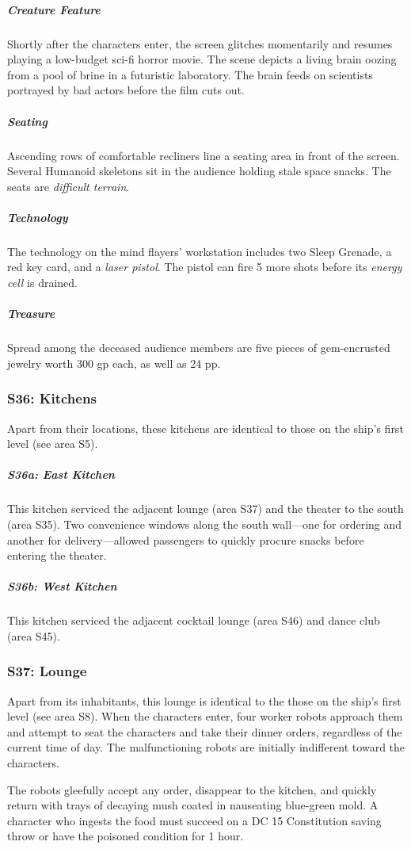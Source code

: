 \documentclass[10pt,a4paper,twoside,bg=print,twocolumn,openany,nodeprecatedcode]{dndbook}
\begin{document}
\subparagraph{Creature Feature}
Shortly after the characters enter, the screen glitches momentarily and resumes playing a low-budget sci-fi horror movie. The scene depicts a living brain oozing from a pool of brine in a futuristic laboratory. The brain feeds on scientists portrayed by bad actors before the film cuts out.

\subparagraph{Seating}
Ascending rows of comfortable recliners line a seating area in front of the screen. Several Humanoid skeletons sit in the audience holding stale space snacks. The seats are \textit{difficult terrain}.

\subparagraph{Technology}
The technology on the mind flayers' workstation includes two Sleep Grenade, a red key card, and a \textit{laser pistol}. The pistol can fire 5 more shots before its \textit{energy cell} is drained.

\subparagraph{Treasure}
Spread among the deceased audience members are five pieces of gem-encrusted jewelry worth 300 gp each, as well as 24 pp.

\subsubsection{S36: Kitchens}
Apart from their locations, these kitchens are identical to those on the ship's first level (see area S5).

\subparagraph{S36a: East Kitchen}
This kitchen serviced the adjacent lounge (area S37) and the theater to the south (area S35). Two convenience windows along the south wall—one for ordering and another for delivery—allowed passengers to quickly procure snacks before entering the theater.

\subparagraph{S36b: West Kitchen}
This kitchen serviced the adjacent cocktail lounge (area S46) and dance club (area S45).

\subsubsection{S37: Lounge}
Apart from its inhabitants, this lounge is identical to the those on the ship's first level (see area S8). When the characters enter, four worker robots approach them and attempt to seat the characters and take their dinner orders, regardless of the current time of day. The malfunctioning robots are initially indifferent toward the characters.

The robots gleefully accept any order, disappear to the kitchen, and quickly return with trays of decaying mush coated in nauseating blue-green mold. A character who ingests the food must succeed on a DC 15 Constitution saving throw or have the poisoned condition for 1 hour.
\end{document}
